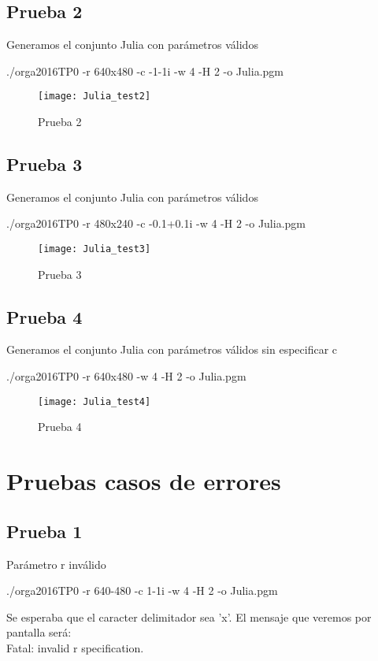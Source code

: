 \documentclass{article}
\begin{document}
\raggedright
\subsection*{Prueba 2}
Generamos el conjunto Julia con par\'ametros v\'alidos
\begin{center}
    ./orga2016TP0 -r 640x480 -c -1-1i -w 4 -H 2 -o Julia.pgm
\end{center}
\begin{figure}[H]
  \begin{center}
  	\texttt{[image: Julia\_test2]}
  \end{center}
  \caption{Prueba 2}
\end{figure}

\raggedright
\subsection*{Prueba 3}
Generamos el conjunto Julia con par\'ametros v\'alidos
\begin{center}
    ./orga2016TP0 -r 480x240 -c -0.1+0.1i -w 4 -H 2 -o Julia.pgm
\end{center}
\begin{figure}[H]
  \begin{center}
  	\texttt{[image: Julia\_test3]}
  \end{center}
  \caption{Prueba 3}
\end{figure}

\raggedright
\subsection*{Prueba 4}
Generamos el conjunto Julia con par\'ametros v\'alidos sin especificar c 
\begin{center}
    ./orga2016TP0 -r 640x480 -w 4 -H 2 -o Julia.pgm
\end{center}
\begin{figure}[H]
  \begin{center}
  	\texttt{[image: Julia\_test4]}
  \end{center}
  \caption{Prueba 4}
\end{figure}

\section{Pruebas casos de errores}
\raggedright
\subsection*{Prueba 1}
Par\'ametro r inv\'alido
\begin{center}
    ./orga2016TP0 -r 640-480 -c 1-1i -w 4 -H 2 -o Julia.pgm\\
\end{center}
Se esperaba que el caracter delimitador sea 'x'. El mensaje que veremos por pantalla ser\'a:\\
\center
Fatal: invalid r specification.
\end{document}
